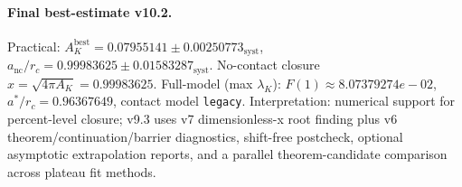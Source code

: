 \paragraph{Final best-estimate v10.2.}
Practical: $A_K^{\mathrm{best}} = 0.07955141 \pm 0.00250773_{\mathrm{syst}}$, $a_{\mathrm{nc}}/r_c = 0.99983625 \pm 0.01583287_{\mathrm{syst}}$.
No-contact closure $x = \sqrt{4\pi A_K} = 0.99983625$.
Full-model (max $\lambda_K$): $F(1) \approx 8.07379274e-02$, $a^*/r_c = 0.96367649$, contact model \texttt{legacy}.
Interpretation: numerical support for percent-level closure; v9.3 uses v7 dimensionless-x root finding plus v6 theorem/continuation/barrier diagnostics, shift-free postcheck, optional asymptotic extrapolation reports, and a parallel theorem-candidate comparison across plateau fit methods.
